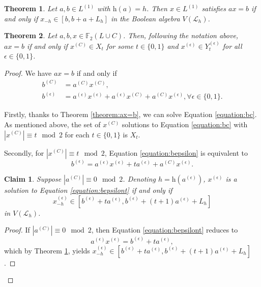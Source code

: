 \documentclass[10pt,a4paper]{amsart}
\newtheorem{theorem}{Theorem}
\newtheorem{claim}{Claim}
\newcommand{\F} {\mathbb{F}}
\newcommand{\Height}    {\mathrm{h}}
\begin{document}
\begin{theorem} \label{theorem:division_Lh}
Let $a, b \in L^{(1)}$ with $\Height( a ) = h$. Then $x \in L^{(1)}$ satisfies $a x = b$ if and only if $x_{ -h } \in [b, b + a + L_h]$ in the Boolean algebra $V( \mathcal{L}_h )$.
\end{theorem}

\begin{theorem} \label{theorem:division_LC}
Let $a, b, x \in \F_2(L \cup C)$. Then, following the notation above, $ax = b$ if and only if $x^{(C)} \in X_t$ for some $t \in \{0,1\}$ and $x^{(\epsilon)} \in  Y_t^{(\epsilon)}$ for all $\epsilon \in \{0,1\}$.
\end{theorem}

\begin{proof}
We have $ax = b$ if and only if
\begin{align}
    \label{equation:bc}
    b^{(C)} &= a^{(C)} x^{(C)}, \\
    \label{equation:bepsilon}
    b^{(\epsilon)} &= a^{(\epsilon)} x^{(\epsilon)} + a^{(\epsilon)} x^{(C)} + a^{(C)} x^{(\epsilon)}, \forall \epsilon \in \{0,1\}.
\end{align}

Firstly, thanks to Theorem \ref{theorem:ax=b}, we can solve Equation \eqref{equation:bc}. 
As mentioned above, the set of $x^{(C)}$ solutions to Equation \eqref{equation:bc} with $|x^{(C)}| \equiv t \mod 2$ for each $t \in \{0,1\}$ is $X_t$.

Secondly, for $|x^{(C)}| \equiv t \mod 2$, Equation \eqref{equation:bepsilon} is equivalent to
\begin{equation}
    \label{equation:bepsilont}
    b^{(\epsilon)} = a^{(\epsilon)} x^{(\epsilon)} + t a^{(\epsilon)} + a^{(C)} x^{(\epsilon)}.
\end{equation}

\begin{claim}
Suppose $|a^{(C)}| \equiv 0 \mod 2$. Denoting $h = \Height( a^{(\epsilon)} )$, $x^{(\epsilon)}$ is a solution to Equation \eqref{equation:bepsilont} if and only if
\[
    x^{(\epsilon)}_{ -h } \in [ b^{(\epsilon)} + t a^{(\epsilon)}, b^{(\epsilon)} + (t + 1) a^{(\epsilon)} + L_h ]
\]
in $V( \mathcal{L}_h )$.
\end{claim}

\begin{proof}
If $|a^{(C)}| \equiv 0 \mod 2$, then Equation \eqref{equation:bepsilont} reduces to
\[
    a^{(\epsilon)} x^{(\epsilon)} = b^{(\epsilon)} + t a^{(\epsilon)},
\]
which by Theorem \ref{theorem:division_Lh}, yields $x^{(\epsilon)}_{ -h } \in [ b^{(\epsilon)} + t a^{(\epsilon)}, b^{(\epsilon)} + (t + 1) a^{(\epsilon)} + L_h ]$.
\end{proof}



\end{proof}
\end{document}
